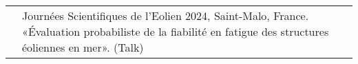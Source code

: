 \begin{center}
\begin{tabularx}{\textwidth}{c X}
                    & Journ\'{e}es Scientifiques de l’Eolien 2024, Saint-Malo, France. «\'{E}valuation probabiliste de la fiabilit\'{e} en fatigue des structures \'{e}oliennes en mer». (Talk)
                    
        \end{tabularx}    
\end{center}